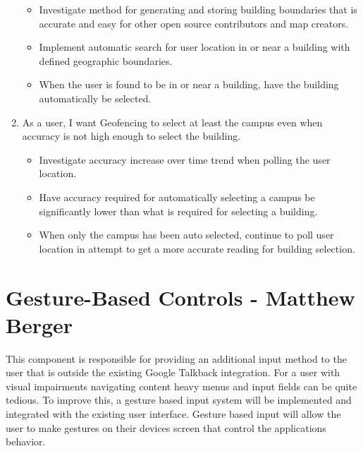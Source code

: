 \documentclass{scrreprt}
\begin{document}
\begin{enumerate}
\begin{itemize}
			\item Investigate method for generating and storing building boundaries that is accurate and easy for other open source contributors and map creators.
			\item Implement automatic search for user location in or near a building with defined geographic boundaries.
			\item When the user is found to be in or near a building, have the building automatically be selected.
		\end{itemize}
\pagebreak
	\item As a user, I want Geofencing to select at least the campus even when accuracy is not high enough to select the building.
	
		\begin{itemize}
			\item Investigate accuracy increase over time trend when polling the user location.
			\item Have accuracy required for automatically selecting a campus be significantly lower than what is required for selecting a building.
			\item When only the campus has been auto selected, continue to poll user location in attempt to get a more accurate reading for building selection.
		\end{itemize}
\end{enumerate}

\pagebreak

\section{Gesture-Based Controls - Matthew Berger}
This component is responsible for providing an additional input method to the user that is outside the existing Google Talkback integration. For a user with visual impairments navigating content heavy menus and input fields can be quite tedious. To improve this, a gesture based input system will be implemented and integrated with the existing user interface. Gesture based input will allow the user to make gestures on their devices screen that control the applications behavior.
\end{document}
